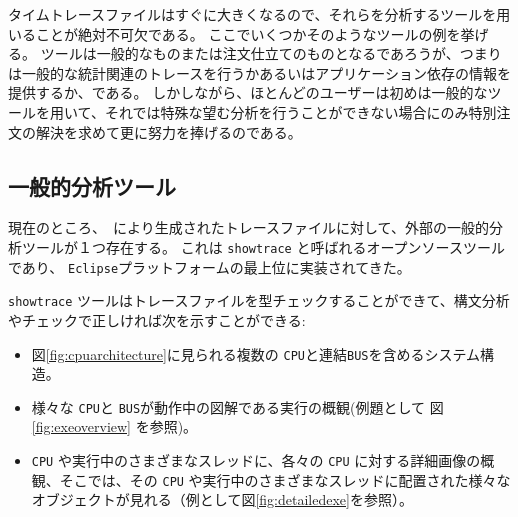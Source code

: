 \documentclass[\pformat,12pt]{jreport}
\begin{document}
タイムトレースファイルはすぐに大きくなるので、それらを分析するツールを用いることが絶対不可欠である。
ここでいくつかそのようなツールの例を挙げる。
ツールは一般的なものまたは注文仕立てのものとなるであろうが、つまりは一般的な統計関連のトレースを行うかあるいはアプリケーション依存の情報を提供するか、である。
しかしながら、ほとんどのユーザーは初めは一般的なツールを用いて、それでは特殊な望む分析を行うことができない場合にのみ特別注文の解決を求めて更に努力を捧げるのである。

\subsection{一般的分析ツール}

現在のところ、\VDMTools\ により生成されたトレースファイルに対して、外部の一般的分析ツールが１つ存在する。
これは \texttt{showtrace} と呼ばれるオープンソースツールであり、 \texttt{Eclipse}プラットフォーム\cite{Carlson05}の最上位に実装されてきた。

 \texttt{showtrace} ツールはトレースファイルを型チェックすることができて、構文分析やチェックで正しければ次を示すことができる:

\begin{itemize}
\item 図\ref{fig:cpuarchitecture}に見られる複数の \texttt{CPU}と連結\texttt{BUS}を含めるシステム構造。
\item 様々な \texttt{CPU}と \texttt{BUS}が動作中の図解である実行の概観(例題として 図\ref{fig:exeoverview} を参照)。
\item  \texttt{CPU} や実行中のさまざまなスレッドに、各々の \texttt{CPU} に対する詳細画像の概観、そこでは、その \texttt{CPU} や実行中のさまざまなスレッドに配置された様々なオブジェクトが見れる（例として図\ref{fig:detailedexe}を参照）。
\end{itemize}
\end{document}

